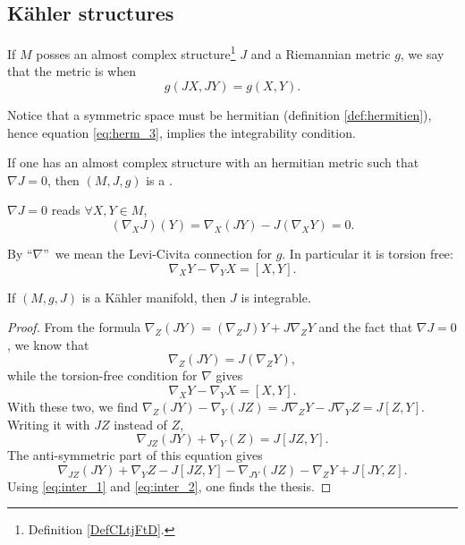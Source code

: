 \subsection{Kähler structures}

\begin{definition}  \label{DefKONtphK}
    If $M$ posses an almost complex structure\footnote{Definition \ref{DefCLtjFtD}.} $J$ and a Riemannian metric $g$, we say that the metric is  when 
    \begin{equation}
       g(JX,JY)=g(X,Y).
    \end{equation}
\end{definition}

Notice that a symmetric space must be hermitian (definition \ref{def:hermitien}), hence equation \eqref{eq:herm_3}, implies the integrability condition. 

\begin{definition}
If one has an almost complex structure with an hermitian metric such that $\nabla J=0$, then $(M,J,g)$ is a .
\end{definition}

\begin{remark}
$\nabla J=0$ reads $\forall X,Y\in M$,
\[
    (\nabla_XJ)(Y)=\nabla_X(JY)-J(\nabla_XY)=0.
\]
\end{remark}

\begin{remark}
By ``$\nabla$''\ we mean the Levi-Civita connection for $g$. In particular it is torsion free:
\[
   \nabla_XY-\nabla_YX=[X,Y].
\]
\end{remark}

\begin{lemma}
If $(M,g,J)$ is a Kähler manifold, then $J$ is integrable.
\end{lemma}

\begin{proof}
From the formula $\nabla_Z(JY)=(\nabla_ZJ)Y+J\nabla_ZY$ and the fact that $\nabla J=0$, we know that 
\begin{equation}\label{eq:inter_1}
  \nabla_Z(JY)=J(\nabla_ZY),
\end{equation}
while the torsion-free condition for $\nabla$ gives
\begin{equation}\label{eq:inter_2}
\nabla_XY-\nabla_YX=[X,Y].
\end{equation}
With these two, we find $\nabla_Z(JY)-\nabla_Y(JZ)=J\nabla_ZY-J\nabla_YZ=J[Z,Y]$.  Writing it with $JZ$ instead of $Z$,
\[
   \nabla_{JZ}(JY)+\nabla_Y(Z)=J[JZ,Y].
\]
The anti-symmetric part of this equation gives
\[
   \nabla_{JZ}(JY)+\nabla_YZ-J[JZ,Y]-\nabla_{JY}(JZ)-\nabla_ZY+J[JY,Z].
\]
Using \eqref{eq:inter_1} and \eqref{eq:inter_2}, one finds the thesis.

\end{proof}

